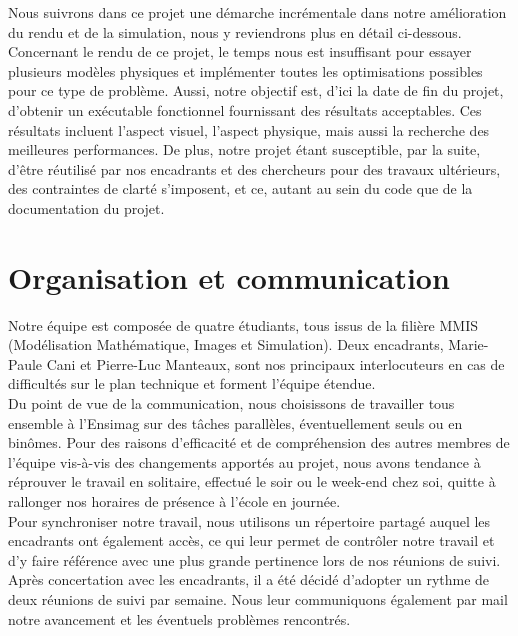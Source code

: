 \documentclass[a4paper,11pt]{article}
\begin{document}
Nous suivrons dans ce projet une démarche incrémentale dans notre amélioration du rendu et de la simulation, nous y reviendrons plus en détail ci-dessous. \\

Concernant le rendu de ce projet, le temps nous est insuffisant pour essayer plusieurs modèles physiques et implémenter toutes les optimisations possibles pour ce type de problème. Aussi, notre objectif est, d'ici la date de fin du projet, d'obtenir un exécutable fonctionnel fournissant des résultats acceptables. Ces résultats incluent l'aspect visuel, l'aspect physique, mais aussi la recherche des meilleures performances. De plus, notre projet étant susceptible, par la suite, d'être réutilisé par nos encadrants et des chercheurs pour des travaux ultérieurs, des contraintes de clarté s'imposent, et ce, autant au sein du code que de la documentation du projet. 

\section{Organisation et communication}

Notre équipe est composée de quatre étudiants, tous issus de la filière MMIS (Modélisation Mathématique, Images et Simulation). Deux encadrants, Marie-Paule Cani et Pierre-Luc Manteaux, sont nos principaux interlocuteurs en cas de difficultés sur le plan technique et forment l'équipe étendue. \\

Du point de vue de la communication, nous choisissons de travailler tous ensemble à l'Ensimag sur des tâches parallèles, éventuellement seuls ou en binômes. Pour des raisons d'efficacité et de compréhension des autres membres de l'équipe vis-à-vis des changements apportés au projet, nous avons tendance à réprouver le travail en solitaire, effectué le soir ou le week-end chez soi, quitte à rallonger nos horaires de présence à l'école en journée. \\

Pour synchroniser notre travail, nous utilisons un répertoire partagé auquel les encadrants ont également accès, ce qui leur permet de contrôler notre travail et d'y faire référence avec une plus grande pertinence lors de nos réunions de suivi. Après concertation avec les encadrants, il a été décidé d'adopter un rythme de deux réunions de suivi par semaine. Nous leur communiquons également par mail notre avancement et les éventuels problèmes rencontrés. \\
\end{document}

